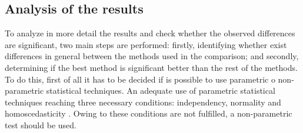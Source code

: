 \documentclass[a4paper,twoside]{article}
\begin{document}
\subsection{Analysis of the results}
\label{analysisresults}

\noindent To analyze in more detail the results and check whether the observed differences are significant, two main steps are performed: firstly, identifying whether exist differences in general between the methods used in the comparison; and secondly, determining if the best method is significant better than the rest of the methods. To do this, first of all it has to be decided if is possible to use parametric o non-parametric statistical techniques. An adequate use of parametric statistical techniques reaching three necessary conditions: independency, normality and homoscedasticity \cite{Sheskin2004}. %
Owing to these conditions are not fulfilled, a non-parametric test should be used.
\end{document}
